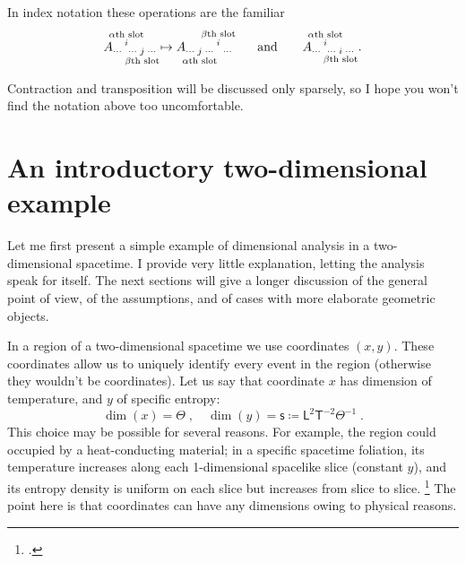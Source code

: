 \documentclass[\ifafour a4paper,12pt,\else a5paper,10pt,\fi%
onecolumn,oneside,article,%
british%
]{memoir}
\makeatletter
\theoremstyle{remark}
\theoremstyle{innote}
\newcommand*{\mathte}[1]{\textbf{\textit{\textsf{#1}}}}
\newcommand*{\citep}{\footcites}
\newcommand*{\defd}{\coloneqq}
\renewcommand*{\|}[1][]{\nonscript\,#1\vert\nonscript\;\mathopen{}}
\newcommand*{\eg}{{e.g.}}
\newcommand*{\q}{}%
\DeclareRobustCommand*{\q}{%
  \mathbin{\mathpalette\bigcdot@{}}%
}
\newcommand*{\bigcdot@scalefactor}{0.7}
\newcommand*{\bigcdot@widthfactor}{1.5}
\newcommand*{\bigcdot@}[2]{%
  \sbox0{$#1\vcenter{}$}%
  \sbox2{$#1\cdot\m@th$}%
  \hbox to \bigcdot@widthfactor\wd2{%
    \hfil
    \raise\ht0\hbox{%
      \scalebox{\bigcdot@scalefactor}{%
        \lower\ht0\hbox{$#1\bullet\m@th$}%
      }%
    }%
    \hfil
  }%
}
\newcommand*{\Le}{\textsf{L}}
\newcommand*{\Ti}{\textsf{T}}
\newcommand*{\Te}{\Theta}
\newcommand*{\Ent}{\textsf{s}}
\newcommand*{\yA}{\mathte{A}}
\renewcommand*{\i}{\indices}
\makeatother
\begin{document}
In index notation these operations are the familiar
\begin{equation*}
  A\i{_{\dotsm\;}^{%
      \overset{\mathclap{\scriptstyle\text{$\alpha$th slot}}}{i}
    }_{\dotsm\;%
      \underset{\mathclap{\scriptstyle\text{$\beta$th slot}}}{j}
      \;\dotsm}}
  \mapsto
  A\i{_{\dotsm\;%
      \underset{\mathclap{\scriptstyle\text{$\alpha$th slot}}}{j}
      \;\dotsm\;}^{%
      \overset{\mathclap{\scriptstyle\text{$\beta$th slot}}}{i}
    }_{\;\dotsm}} 
  \qquad\text{and}\qquad
  A\i{_{\dotsm\;}^{%
      \overset{\mathclap{\scriptstyle\text{$\alpha$th slot}}}{i}
    }_{\dotsm\;%
      \underset{\mathclap{\scriptstyle\text{$\beta$th slot}}}{i}
      \;\dotsm}} \;.
\end{equation*}

Contraction and transposition will be discussed only sparsely, so I hope
you won't find the notation above too uncomfortable.





\section{An introductory two-dimensional example}
\label{sec:2d_example}

Let me first present a simple example of dimensional analysis in a
two-dimensional spacetime. I provide very little explanation, letting the
analysis speak for itself. The next sections will give a longer discussion
of the general point of view, of the assumptions, and of cases with more
elaborate geometric objects.

In a region of a two-dimensional spacetime we use coordinates $(x,y)$.
These coordinates allow us to uniquely identify every event in the region
(otherwise they wouldn't be coordinates). Let us say that coordinate $x$
has dimension of temperature, and $y$ of specific entropy:
\begin{equation}
  \label{eq:example_coords2d}
  \dim(x)=\Te \;,\quad
  \dim(y)= \Ent \defd \Le^{2}\Ti^{-2}\Te^{-1} \;.
\end{equation}
This choice may be possible for several reasons. For example, the region
could occupied by a heat-conducting material; in a specific spacetime
foliation, its temperature increases along each 1-dimensional spacelike
slice (constant $y$), and its entropy density is uniform on each slice but
increases from slice to slice. \citep[For general-relativistic
thermomechanics see
\eg][]{eckart1940c,maugin1974b,maugin1978b,maugin1978c,maugin1978d,maugin1978e,muschiketal2014}
The point here is that coordinates can have any dimensions owing to
physical reasons.
\end{document}
